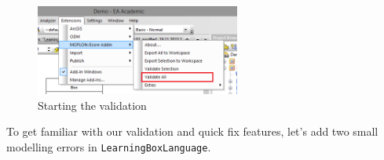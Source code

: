 \begin{enumerate}
\begin{figure}[htbp]
	\centering
  \includegraphics[width=0.6\textwidth]{pics/memBoxBilder/memBox41}
	\caption{Starting the validation}
	\label{fig:validation_menu}
\end{figure}
\FloatBarrier
\end{enumerate}


To get familiar with our validation and quick fix features, let's add two small modelling errors in \texttt{LearningBoxLanguage}.

